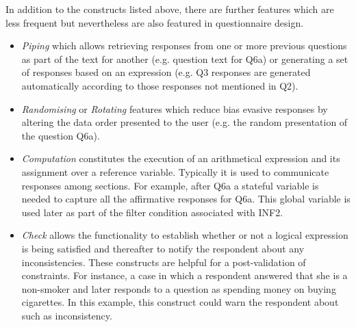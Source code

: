 	In addition to the constructs listed above, there are further features which are less frequent but nevertheless are also featured in questionnaire design.

	\begin{itemize}
		\item \emph{Piping} which allows retrieving responses from one or more previous questions as part of the text for another (e.g. question text for Q6a) or generating a set of responses based on an expression (e.g. Q3 responses are generated automatically according to those responses not mentioned in Q2).
		\item \emph{Randomising} or \emph{Rotating} features which reduce bias evasive responses by altering the data order presented to the user \cite{art:warner65} (e.g. the random presentation of the question Q6a).
		\item \emph{Computation} constitutes the execution of an arithmetical expression and its assignment over a reference variable. Typically it is used to communicate responses among sections. For example, after Q6a a stateful variable is needed to capture all the affirmative responses for Q6a. This global variable is used later as part of the filter condition associated with INF2.
		\item \emph{Check} allows the functionality to establish whether or not a logical expression is being satisfied and thereafter to notify the respondent about any inconsistencies. These constructs are helpful for a post-validation of constraints. For instance, a case in which a respondent answered that she is a non-smoker and later responds to a question as spending money on buying cigarettes. In this example, this construct could warn the respondent about such as inconsistency.
	\end{itemize}

